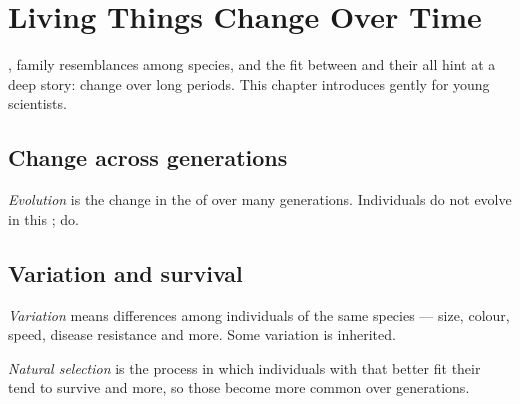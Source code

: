 \chapter{Living Things Change Over Time}\label{ch:g5:evolution}

, family resemblances among species, and the fit between
 and their  all hint at a deep story: 
change over long periods. This chapter introduces  gently for
young scientists.

\section{Change across generations}

\begin{definition}[Evolution]\label{def:g5:evolution:def}
\emph{Evolution} is the change in the 
of  over many generations. Individuals do not evolve in this
;  do.
\end{definition}

\section{Variation and survival}

\begin{definition}[Variation]\label{def:g5:evolution:variation}
\emph{Variation} means differences among individuals
of the same species --- size, colour, speed, disease resistance and
more. Some variation is inherited.
\end{definition}

\begin{definition}\label{def:g5:evolution:ns}
\emph{Natural selection} is the process in
which individuals with  that better fit their
 tend to survive and  more, so those  become
more common over generations.
\end{definition}

